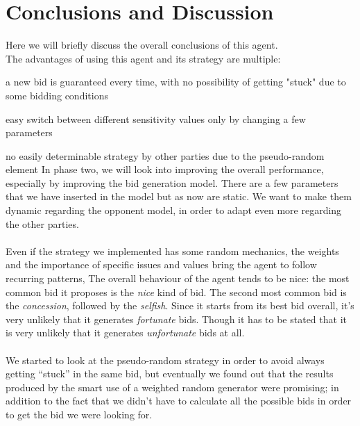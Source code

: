 \documentclass[a4,11pt]{scrartcl}
\let\tempone\itemize
\let\temptwo\enditemize
\renewenvironment{itemize}{\tempone\addtolength{\itemsep}{-0.5\baselineskip}}{\temptwo}
\begin{document}
\section{Conclusions and Discussion}\label{conclusion}
Here we will briefly discuss the overall conclusions of this agent.\\
The advantages of using this agent and its strategy are multiple:
\begin{itemize}
\item a new bid is guaranteed every time, with no possibility of getting "stuck" due to some bidding conditions
\item easy switch between different sensitivity values only by changing a few parameters
\item no easily determinable strategy by other parties due to the pseudo-random element 
\end{itemize}
In phase two, we will look into improving the overall performance, especially by improving the bid generation model. There are a few parameters that we have inserted in the model but as now are static. We want to make them dynamic regarding the opponent model, in order to adapt even more regarding the other parties. \\ \\
Even if the strategy we implemented has some random mechanics, the weights and the importance of specific issues and values bring the agent to follow recurring patterns, The overall behaviour of the agent tends to be nice: the most common bid it proposes is the \textit{nice}  kind of bid. The second most common bid is the \textit{concession}, followed by the \textit{selfish}. Since it starts from its best bid overall, it's very unlikely that it generates \textit{fortunate} bids. Though it has to be stated that it is very unlikely that it generates \textit{unfortunate} bids at all. \\ \\
We started to look at the pseudo-random strategy in order to avoid always getting “stuck” in the same bid, but eventually we found out that the results produced by the smart use of a weighted random generator were promising; in addition to the fact that we didn't have to calculate all the possible bids in order to get the bid we were looking for.\\ \\ \\
\end{document}
